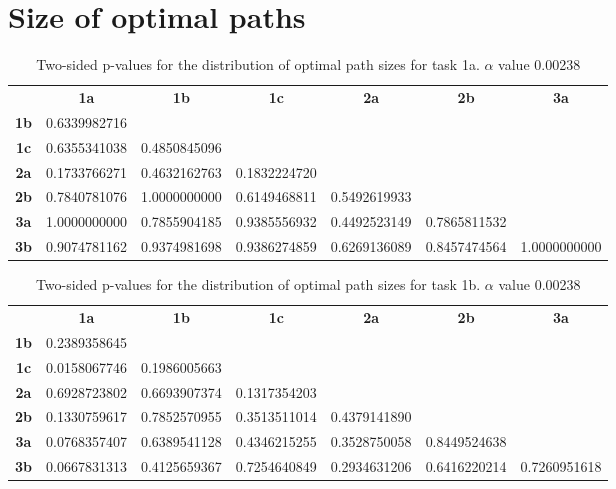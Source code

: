 \section{Size of optimal paths}
\label{appendix:ptable.pathsize}
\begin{table}[h!]
    \centering
    \begin{tabular}{ccccccc}
                & \textbf{1a}  & \textbf{1b}  & \textbf{1c}  & \textbf{2a}  & \textbf{2b}  & \textbf{3a}  \\
    \textbf{1b} & 0.6339982716 &              &              &              &              &              \\
    \textbf{1c} & 0.6355341038 & 0.4850845096 &              &              &              &              \\
    \textbf{2a} & 0.1733766271 & 0.4632162763 & 0.1832224720 &              &              &              \\
    \textbf{2b} & 0.7840781076 & 1.0000000000 & 0.6149468811 & 0.5492619933 &              &              \\
    \textbf{3a} & 1.0000000000 & 0.7855904185 & 0.9385556932 & 0.4492523149 & 0.7865811532 &              \\
    \textbf{3b} & 0.9074781162 & 0.9374981698 & 0.9386274859 & 0.6269136089 & 0.8457474564 & 1.0000000000
    \end{tabular}
    \caption{Two-sided p-values for the distribution of optimal path sizes for task 1a. \(\alpha\) value 0.00238}
    \label{tab:exp2.pathsize1a}
\end{table}

\begin{table}[h!]
    \centering
    \begin{tabular}{ccccccc}
                & \textbf{1a}  & \textbf{1b}  & \textbf{1c}  & \textbf{2a}  & \textbf{2b}  & \textbf{3a}  \\
    \textbf{1b} & 0.2389358645 &              &              &              &              &              \\
    \textbf{1c} & 0.0158067746 & 0.1986005663 &              &              &              &              \\
    \textbf{2a} & 0.6928723802 & 0.6693907374 & 0.1317354203 &              &              &              \\
    \textbf{2b} & 0.1330759617 & 0.7852570955 & 0.3513511014 & 0.4379141890 &              &              \\
    \textbf{3a} & 0.0768357407 & 0.6389541128 & 0.4346215255 & 0.3528750058 & 0.8449524638 &              \\
    \textbf{3b} & 0.0667831313 & 0.4125659367 & 0.7254640849 & 0.2934631206 & 0.6416220214 & 0.7260951618
    \end{tabular}
    \caption{Two-sided p-values for the distribution of optimal path sizes for task 1b. \(\alpha\) value 0.00238}
    \label{tab:exp2.pathsize1b}
\end{table}

